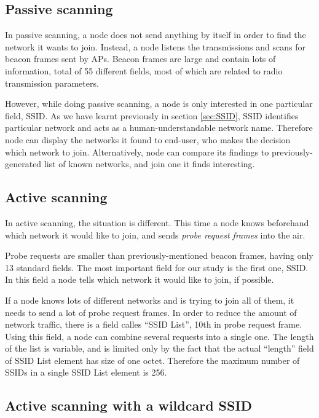\documentclass[12pt,a4paper,oneside,pdftex]{report}
\begin{document}
\subsection{Passive scanning}
\label{subsec:passive_scanning}

In passive scanning, a node does not send anything by itself in order to find the network it wants to join. Instead, a node listens the transmissions and scans for beacon frames sent by APs. Beacon frames are large and contain lots of information, total of 55 different fields, most of which are related to radio transmission parameters.

However, while doing passive scanning, a node is only interested in one particular field, SSID. As we have learnt previously in section \ref{sec:SSID}, SSID identifies particular network and acts as a human-understandable network name. Therefore node can display the networks it found to end-user, who makes the decision which network to join. Alternatively, node can compare its findings to previously-generated list of known networks, and join one it finds interesting.

\subsection{Active scanning}
\label{subsec:active_scanning}

In active scanning, the situation is different. This time a node knows beforehand which network it would like to join, and sends \emph{probe request frames} into the air. 

Probe requests are smaller than previously-mentioned beacon frames, having only 13 standard fields. The most important field for our study is the first one, SSID. In this field a node tells which network it would like to join, if possible. 

If a node knows lots of different networks and is trying to join all of them, it needs to send a lot of probe request frames. In order to reduce the amount of network traffic, there is a field calles ``SSID List'', 10th in probe request frame. Using this field, a node can combine several requests into a single one. The length of the list is variable, and is limited only by the fact that the actual ``length'' field of SSID List element has size of one octet. Therefore the maximum number of SSIDs in a single SSID List element is 256.

\subsection{Active scanning with a wildcard SSID}
\label{subsec:active_wildcard}
\end{document}
